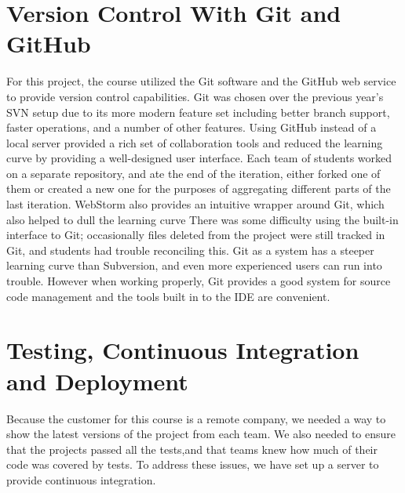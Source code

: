 \documentclass[12pt]{article}
\begin{document}
\section{Version Control With Git and GitHub}\label{sec:git}
For this project, the course utilized the Git\cite{Git} software and the GitHub\cite{GitHub} web service to provide version control capabilities. Git was chosen over the previous year's SVN setup due to its more modern feature set including better branch support, faster operations, and a number of other features. Using GitHub instead of a local server provided a rich set of collaboration tools and reduced the learning curve by providing a well-designed user interface. Each team of students worked on a separate repository, and ate the end of the iteration, either forked one of them or created a new one for the purposes of aggregating different parts of the last iteration. WebStorm also provides an intuitive wrapper around Git, which also helped to dull the learning curve There was some difficulty using the built-in interface to Git; occasionally files deleted from the project were still tracked in Git, and students had trouble reconciling this. Git as a system has a steeper learning curve than Subversion, and even more experienced users can run into trouble. However when working properly, Git provides a good system for source code management and the tools built in to the IDE are convenient.


\section{Testing, Continuous Integration and Deployment}\label{sec:CI}
Because the customer for this course is a remote company, we needed a way to show the latest versions of the project from each team. We also needed to ensure that the projects passed all the tests,and that teams knew how much of their code was covered by tests. To address these issues, we have set up a server to provide continuous integration.
\end{document}
